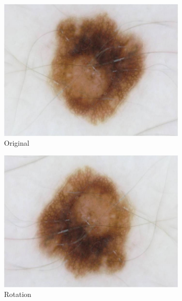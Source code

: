 \begin{figure}[t]
	\centering
	\begin{subfigure}[t]{0.24\linewidth}
		\includegraphics[width=\textwidth]{pics/augmentations/original.jpg}
		\caption{Original}
		\label{subfig:aug_original}
	\end{subfigure}
	\begin{subfigure}[t]{0.24\linewidth}
		\includegraphics[width=\textwidth]{pics/augmentations/rotation.png}
		\caption{Rotation}
		\label{subfig:aug_rot}
	\end{subfigure}
	\begin{subfigure}[t]{0.24\linewidth}

\end{subfigure}
\end{figure}
